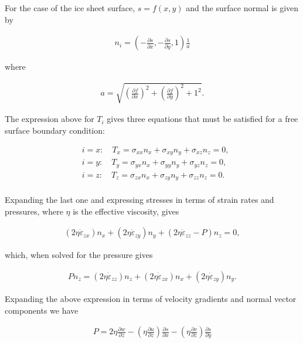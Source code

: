 For the case of the ice sheet surface, $s = f(x,y)$ and the surface normal is given by

\begin{align*}
n_{i}=\left( -\frac{\partial s}{\partial x},-\frac{\partial s}{\partial y},1 \right)\frac{1}{a}
\end{align*}

where

\begin{align*}
a=\sqrt{\left( \frac{\partial f}{\partial x} \right)^{2}+\left( \frac{\partial f}{\partial y} \right)^{2}+1^{2}}.
\end{align*}

The expression above for $T_i$ gives three equations that must be satisfied for a free surface boundary condition:

\begin{align*}
  & i=x:\quad T_{x}=\sigma _{xx}n_{x}+\sigma _{xy}n_{y}+\sigma _{xz}n_{z}=0, \\ 
 & i=y:\quad T_{y}=\sigma _{yx}n_{x}+\sigma _{yy}n_{y}+\sigma _{yz}n_{z}=0, \\ 
 & i=z:\quad T_{z}=\sigma _{zx}n_{x}+\sigma _{zy}n_{y}+\sigma _{zz}n_{z}=0. \\ 
\end{align*}

Expanding the last one and expressing stresses in terms of strain rates and pressures, where $\eta$ is the effective viscosity, gives

\begin{align*}
\left( 2\eta \dot{\varepsilon }_{zx} \right)n_{x}+\left( 2\eta \dot{\varepsilon }_{zy} \right)n_{y}+\left( 2\eta \dot{\varepsilon }_{zz}-P \right)n_{z}=0,
\end{align*}

which, when solved for the pressure gives

\begin{align*}
Pn_{z}=\left( 2\eta \dot{\varepsilon }_{zz} \right)n_{z}+\left( 2\eta \dot{\varepsilon }_{zx} \right)n_{x}+\left( 2\eta \dot{\varepsilon }_{zy} \right)n_{y}.
\end{align*}


Expanding the above expression in terms of velocity gradients and normal vector components we have

\begin{align*}
P=2\eta \frac{\partial w}{\partial z}-\left( \eta \frac{\partial u}{\partial z} \right)\frac{\partial s}{\partial x}-\left( \eta \frac{\partial v}{\partial z} \right)\frac{\partial s}{\partial y}
\end{align*}

